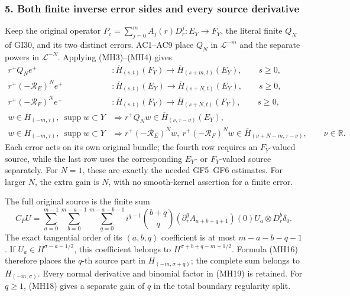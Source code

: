 \documentclass[
  11pt,
]{article}
\begin{document}
\subsubsection{5. Both finite inverse error sides and every source
derivative}\label{both-finite-inverse-error-sides-and-every-source-derivative}

Keep the original operator \(P_c=\sum_{j=0}^mA_j(r)D_r^j:E_Y\to F_Y\),
the literal finite \(Q_N\) of GI30, and its two distinct errors.
AC1--AC9 place \(Q_N\) in \(\mathcal L^{-m}\) and the separate powers in
\(\mathcal L^{-N}\). Applying (MH3)--(MH4) gives \[
 \begin{aligned}
 r^+Q_Ne^+&:\overline H_{(s,t)}(F_Y)
                  \to\overline H_{(s+m,t)}(E_Y),\qquad s\geq0,\\
 r^+(-\mathcal R_E)^Ne^+&:\overline H_{(s,t)}(E_Y)
                  \to\overline H_{(s+N,t)}(E_Y),\qquad s\geq0,\\
 r^+(-\mathcal R_F)^Ne^+&:\overline H_{(s,t)}(F_Y)
                  \to\overline H_{(s+N,t)}(F_Y),\qquad s\geq0,\\
 w\in H_{(-m,\tau)},\ \operatorname{supp}w\subset Y
 &\Longrightarrow r^+Q_Nw\in\overline H_{(\nu,\tau-\nu)}(E_Y),\\
 w\in H_{(-m,\tau)},\ \operatorname{supp}w\subset Y
 &\Longrightarrow r^+(-\mathcal R_E)^Nw,
                    \ r^+(-\mathcal R_F)^Nw
                  \in\overline H_{(\nu+N-m,\tau-\nu)},
                  \qquad\nu\in\mathbb R.
 \end{aligned}
 \tag{MH18}
\] Each error acts on its own original bundle; the fourth row requires
an \(F_Y\)-valued source, while the last row uses the corresponding
\(E_Y\)- or \(F_Y\)-valued source separately. For \(N=1\), these are
exactly the needed GF5--GF6 estimates. For larger \(N\), the extra gain
is \(N\), with no smooth-kernel assertion for a finite error.

The full original source is the finite sum \[
 C_PU=\sum_{a=0}^{m-1}\sum_{b=0}^{m-a-1}
       \sum_{q=0}^{m-a-b-1}
 i^{q-1}\binom{b+q}{q}
  (\partial_r^q A_{a+b+q+1})(0)U_a\otimes D_r^b\delta_0.
 \tag{MH19}
\] The exact tangential order of its \((a,b,q)\) coefficient is at most
\(m-a-b-q-1\). If \(U_a\in H^{\sigma-a-1/2}\), this coefficient belongs
to \(H^{\sigma+b+q-m+1/2}\). Formula (MH16) therefore places the
\(q\)-th source part in \(H_{(-m,\sigma+q)}\); the complete sum belongs
to \(H_{(-m,\sigma)}\). Every normal derivative and binomial factor in
(MH19) is retained. For \(q\geq1\), (MH18) gives a separate gain of
\(q\) in the total boundary regularity split.
\end{document}
